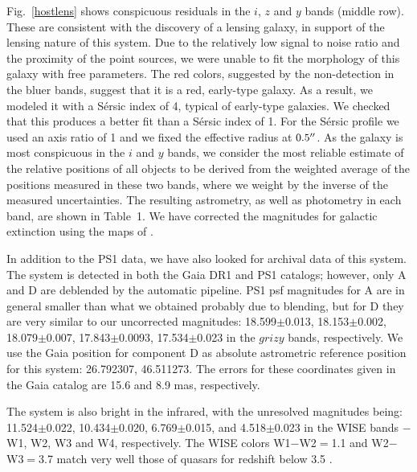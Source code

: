 \documentclass[manuscript]{aastex}
\begin{document}
Fig.~\ref{hostlens} shows conspicuous residuals in the $i$, $z$ and $y$ bands (middle row). These are consistent with the discovery of a lensing galaxy, in support of the lensing nature of this system. Due to the relatively low signal to noise ratio and the proximity of the point sources, we were unable to fit the morphology of this galaxy with free parameters. The red colors, suggested by the non-detection in the bluer bands, suggest that it is a red, early-type galaxy. As a result, we modeled it with a S{\'e}rsic index of 4, typical of early-type galaxies. We checked that this produces a better fit than a S{\'e}rsic index of 1. For the S{\'e}rsic profile we used an axis ratio of 1 and we fixed the effective radius at $0.5\mbox{$^{\prime\prime}$}$. As the galaxy is most conspicuous in the $i$ and $y$ bands, we consider the most reliable estimate of the relative positions of all objects to be derived from the weighted average of the positions measured in these two bands, where we weight by the inverse of the measured uncertainties. The resulting astrometry, as well as photometry in each band, are shown in Table~1. We have corrected the magnitudes for galactic extinction using the maps of \citet{sch11}.

In addition to the PS1 data, we have also looked for archival data of this system. The system is detected in both the Gaia \citep{gaia} DR1 and PS1 catalogs; however, only A and D are deblended by the automatic pipeline. PS1 psf magnitudes for A are in general smaller than what we obtained probably due to blending, but for D they are very similar to our uncorrected magnitudes: 18.599$\pm$0.013,  18.153$\pm$0.002,  18.079$\pm$0.007,  17.843$\pm$0.0093,  17.534$\pm$0.023 in the $grizy$ bands, respectively. We use the Gaia position for component D as absolute astrometric reference position for this system: 26.792307, 46.511273. The errors for these coordinates given in the Gaia catalog are 15.6 and 8.9 mas, respectively.


The system is also bright in the infrared, with the unresolved magnitudes being: 11.524$\pm$0.022, 10.434$\pm$0.020, 6.769$\pm$0.015, and 4.518$\pm$0.023 in the WISE bands $-$ W1, W2, W3 and W4, respectively. The WISE colors W1$-$W2$=$1.1 and W2$-$W3$=$3.7 match very well those of quasars for redshift below 3.5 \citep[e.g.][]{wu12}. 
\end{document}

